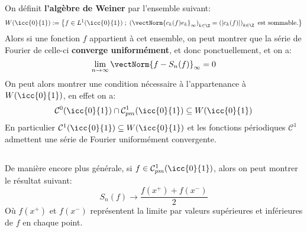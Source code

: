 \subsection*{}
On définit \textbf{l'algèbre de Weiner} par l'ensemble suivant:
\[ 
   W(\icc{0}{1}) := \left\{ f \in L^1(\icc{0}{1}) \; ; \; \left(\vectNorm{c_k(f)e_k}_\infty\right)_{k \in \Z} = \left(|c_k(f)|\right)_{k \in \Z} \text{ est sommable.} \right\}  
\]
Alors si une fonction \( f \) appartient à cet ensemble, on peut montrer que la série de Fourier de celle-ci \textbf{converge uniformément}, et donc ponctuellement, et on a:
\[ 
   \lim_{n \rightarrow \infty}\vectNorm{f - S_n(f)}_\infty = 0
\]
On peut alors montrer une condition nécessaire à l'appartenance à \( W(\icc{0}{1}) \), en effet on a:
\[ 
   \mathcal{C}^0(\icc{0}{1}) \cap \mathcal{C}^1_{pm}(\icc{0}{1}) \subseteq W(\icc{0}{1})
\]
En particulier \( \mathcal{C}^1(\icc{0}{1}) \subseteq W(\icc{0}{1}) \) et les fonctions périodiques \( \mathcal{C}^1 \) admettent une série de Fourier uniformément convergente.

\subsection*{}
De manière encore plus générale, si \( f \in \mathcal{C}^1_{pm}( \icc{0}{1})\), alors on peut montrer le résultat suivant:
\[ 
   S_n(f) \longrightarrow \frac{f(x^+) + f(x^-)}{2} 
\]
Où \( f(x^+) \) et \(  f(x^-)  \) représentent la limite par valeurs supérieures et inférieures de \( f \) en chaque point.